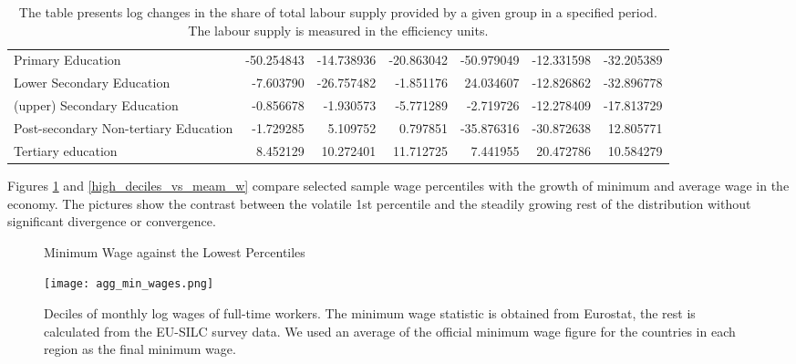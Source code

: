 \documentclass[11pt]{article}
\begin{document}
\begin{table}[!htbp]
\begin{center}
{\begin{tabular}{lrrrrrr}
Primary Education                     & -50.254843 & -14.738936 & -20.863042 & -50.979049 &  -12.331598 & -32.205389 \\
Lower Secondary Education             &  -7.603790 & -26.757482 &  -1.851176 &  24.034607 &  -12.826862 & -32.896778 \\
(upper) Secondary Education           &  -0.856678 &  -1.930573 &  -5.771289 &  -2.719726 &  -12.278409 & -17.813729 \\
Post-secondary Non-tertiary Education &  -1.729285 &   5.109752 &   0.797851 & -35.876316 &  -30.872638 &  12.805771 \\
Tertiary education                    &   8.452129 &  10.272401 &  11.712725 &   7.441955 &   20.472786 &  10.584279 \\
\bottomrule
\end{tabular}

}
\caption*{ \footnotesize The table presents log changes in the share of total labour supply provided by a given group in a specified period. The labour supply is measured in the efficiency units.}
\end{center}
\end{table}

Figures \ref{low_deciles_vs_min_w} and \ref{high_deciles_vs_meam_w} compare selected sample wage percentiles with the growth of minimum and average wage in the economy. The pictures show the contrast between the volatile 1st percentile and the steadily growing rest of the distribution without significant divergence or convergence.

\begin{figure}[!htbp]%
    \centering
    \caption{Minimum Wage against the Lowest Percentiles}
    {\texttt{[image: agg\_min\_wages.png]} }
    \label{low_deciles_vs_min_w}
    \caption*{\footnotesize Deciles of monthly log wages of full-time workers. The minimum wage statistic is obtained from Eurostat, the rest is calculated from the EU-SILC survey data. We used an average of the official minimum wage figure for the countries in each region as the final minimum wage.}
\end{figure}
\end{document}
